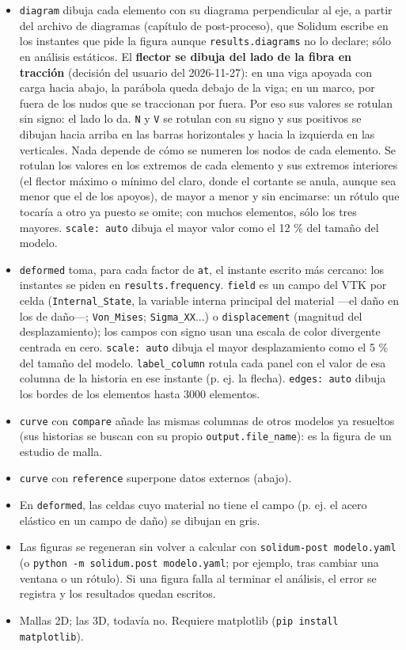 \documentclass[11pt,oneside]{report}
\begin{document}
\begin{itemize}
  \item \texttt{diagram} dibuja cada elemento con su diagrama perpendicular al eje, a partir del archivo de diagramas (capítulo de post-proceso), que Solidum escribe en los instantes que pide la figura aunque \texttt{results.diagrams} no lo declare; sólo en análisis estáticos. El \textbf{flector se dibuja del lado de la fibra en tracción} (decisión del usuario del 2026-11-27): en una viga apoyada con carga hacia abajo, la parábola queda debajo de la viga; en un marco, por fuera de los nudos que se traccionan por fuera. Por eso sus valores se rotulan sin signo: el lado lo da. \texttt{N} y \texttt{V} se rotulan con su signo y sus positivos se dibujan hacia arriba en las barras horizontales y hacia la izquierda en las verticales. Nada depende de cómo se numeren los nodos de cada elemento. Se rotulan los valores en los extremos de cada elemento y sus extremos interiores (el flector máximo o mínimo del claro, donde el cortante se anula, aunque sea menor que el de los apoyos), de mayor a menor y sin encimarse: un rótulo que tocaría a otro ya puesto se omite; con muchos elementos, sólo los tres mayores. \texttt{scale: auto} dibuja el mayor valor como el 12 \% del tamaño del modelo.
  \item \texttt{deformed} toma, para cada factor de \texttt{at}, el instante escrito más cercano: los instantes se piden en \texttt{results.\allowbreak{}frequency}. \texttt{field} es un campo del VTK por celda (\texttt{Internal\_State}, la variable interna principal del material ---el daño en los de daño---; \texttt{Von\_Mises}; \texttt{Sigma\_XX}...) o \texttt{displacement} (magnitud del desplazamiento); los campos con signo usan una escala de color divergente centrada en cero. \texttt{scale: auto} dibuja el mayor desplazamiento como el 5 \% del tamaño del modelo. \texttt{label\_column} rotula cada panel con el valor de esa columna de la historia en ese instante (p. ej. la flecha). \texttt{edges: auto} dibuja los bordes de los elementos hasta 3000 elementos.
  \item \texttt{curve} con \texttt{compare} añade las mismas columnas de otros modelos ya resueltos (sus historias se buscan con su propio \texttt{output.file\_name}): es la figura de un estudio de malla.
  \item \texttt{curve} con \texttt{reference} superpone datos externos (abajo).
  \item En \texttt{deformed}, las celdas cuyo material no tiene el campo (p. ej. el acero elástico en un campo de daño) se dibujan en gris.
  \item Las figuras se regeneran sin volver a calcular con \texttt{solidum-post modelo.\allowbreak{}yaml} (o \texttt{python -m solidum.\allowbreak{}post modelo.\allowbreak{}yaml}; por ejemplo, tras cambiar una ventana o un rótulo). Si una figura falla al terminar el análisis, el error se registra y los resultados quedan escritos.
  \item Mallas 2D; las 3D, todavía no. Requiere matplotlib (\texttt{pip install matplotlib}).
\end{itemize}
\end{document}
